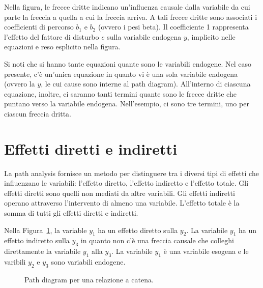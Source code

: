 Nella figura, le frecce dritte indicano un'influenza causale dalla variabile
da cui parte la freccia a quella a cui la freccia arriva. 
A tali
frecce dritte sono associati i coefficienti di percorso $b_1$ e $b_2$
(ovvero i pesi beta).
Il coefficiente 1 rappresenta l'effetto del fattore di disturbo $e$ sulla variabile endogena $y$, implicito nelle
equazioni e reso esplicito nella figura. 

Si noti che si hanno tante equazioni quante sono le variabili endogene. Nel caso presente, c'è un'unica equazione in quanto vi è una sola variabile endogena (ovvero la $y$, le cui cause sono interne al path diagram). All'interno di ciascuna equazione, inoltre, ci saranno tanti termini quante sono le frecce dritte che puntano verso la variabile endogena. Nell'esempio, ci sono tre termini, uno per ciascun freccia dritta.

\section{Effetti diretti e indiretti}

La path analysis fornisce un metodo per distinguere tra i diversi tipi di effetti che influenzano le variabili: 
l'effetto diretto, 
l'effetto indiretto e 
l'effetto totale.
Gli effetti
diretti sono quelli non mediati da altre variabili.
Gli effetti
indiretti operano attraverso l'intervento di almeno una variabile.
 L'effetto totale è la somma di tutti gli effetti diretti e indiretti.

Nella Figura~\ref{fig:path_diagram_catena}, la variable $y_1$ ha un effetto
diretto sulla $y_2$. 
La variabile $y_1$ ha un effetto indiretto sulla
$y_3$ in quanto non c'è una freccia causale che colleghi direttamente
la variabile $y_1$ alla $y_3$. 
La variabile $y_1$ è una variabile
esogena e le varibili $y_2$ e $y_3$ sono variabili endogene.


\begin{figure}[h!]
\centering
{}
\caption{Path diagram per una relazione a catena.}
\label{fig:path_diagram_catena}
\end{figure}


